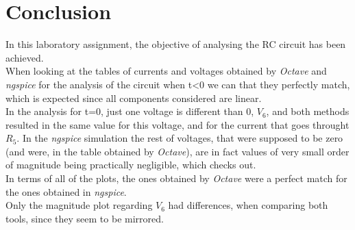 \section{Conclusion}
\label{sec:conclusion}
In this laboratory assignment, the objective of analysing the RC circuit has been achieved. \\
When looking at the tables of currents and voltages obtained by \textit{Octave} and \textit{ngspice} for the analysis of the circuit when t\textless 0 we can that they perfectly match, which is expected since all components considered are linear.\\
In the analysis for t=0, just one voltage is different than 0, $V_6$, and both methods resulted in the same value for this voltage, and for the current that goes throught $R_5$. In the \textit{ngspice} simulation the rest of voltages, that were supposed to be zero (and were, in the table obtained by \textit{Octave}), are in fact values of very small order of magnitude being practically negligible, which checks out.\\
In terms of all of the plots, the ones obtained by \textit{Octave} were a perfect match for the ones obtained in \textit{ngspice}.\\
Only the magnitude plot regarding $V_6$ had differences, when comparing both tools, since they seem to be mirrored.

